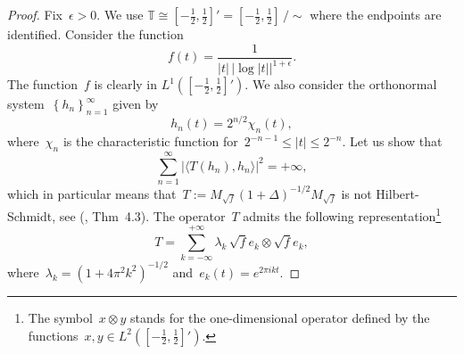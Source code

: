 \documentclass[final,1p]{elsarticle}
\numberwithin{equation}{section}
\theoremstyle{plain}
\theoremstyle{definition}
\begin{document}
\begin{proof}
  Fix~$\epsilon > 0$.  We use ${\ensuremath{\mathbb{T}}} \cong [-\frac{1}{2},\frac{1}{2}]' = [-\frac{1}{2},\frac{1}{2}] \, / \! \! \sim$ where the endpoints are identified.  Consider the function $$ f(t) = \frac
  1 { \left| t \right|\, \left| \log |t| \right|^{1 + \epsilon}}. $$ The
  function~$f$ is clearly in $L^1([- \frac 12, \frac 12]')$.  We also
  consider the orthonormal system~$\left\{h_n \right\}_{n =
    1}^\infty$ given by $$ h_n (t) = 2^{n/2} \chi_n (t), $$
  where~$\chi_n$ is the characteristic function for~$2^{-n - 1} \leq \left|
    t \right| \leq 2^{-n}$.  Let us show that
  \begin{equation}
    \label{CFexampleObjective}
    \sum_{n = 1}^\infty \left|  \langle T(h_n), h_n \rangle  \right|^2
    = + \infty ,
  \end{equation}
  which in particular means that~$T:= M_{\sqrt{f}}(1+\Delta)^{-1/2}M_{\sqrt{f}}$ is not Hilbert-Schmidt, see (\cite{GohbergKrein}, Thm~4.3).  The operator~$T$ admits the
  following representation\footnote{The symbol~$x \otimes y$ stands
    for the one-dimensional operator defined by the functions~$x, y
    \in L^2([-\frac 12, \frac 12]')$.}
  \begin{equation}
    \label{Trepresentation}
    T = \sum_{k = - \infty}^{+\infty} \lambda_k \, \sqrt{f}  e_k \otimes
    \sqrt{f} e_k,
  \end{equation}
  where~$\lambda_k = (1 + 4\pi^2 k^2)^{-1/2}$ and~$e_k(t) =
  e^{2\pi i k t}$.


\end{proof}
\end{document}
